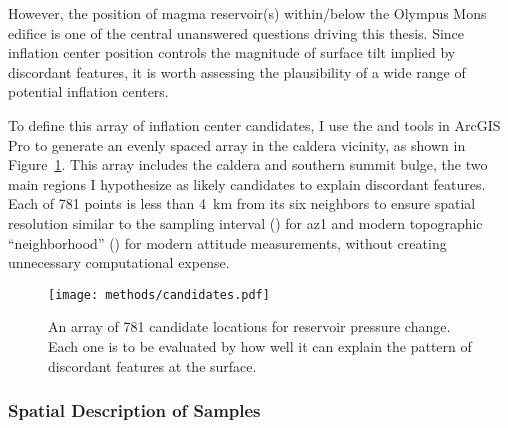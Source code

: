 However, the position of magma reservoir(s) within/below the Olympus Mons edifice is one of the central unanswered questions driving this thesis. Since inflation center position controls the magnitude of surface tilt implied by discordant features, it is worth assessing the plausibility of a wide range of potential inflation centers.

To define this array of inflation center candidates, I use the  and  tools in ArcGIS Pro to generate an evenly spaced array in the caldera vicinity, as shown in Figure~\ref{fig:candidates}. This array includes the caldera and southern summit bulge, the two main regions I hypothesize as likely candidates to explain discordant features. Each of 781 points is less than \qty{4}{\km} from its six neighbors to ensure spatial resolution similar to the sampling interval (\samplinginterval) for \acl{az1} and modern topographic ``neighborhood'' (\neighborhood) for modern attitude measurements, without creating unnecessary computational expense.

\begin{figure}
    \texttt{[image: methods/candidates.pdf]}%
    \caption[Inflation center candidates]{An array of 781 candidate locations for reservoir pressure change. Each one is to be evaluated by how well it can explain the pattern of discordant features at the surface.}%
    \label{fig:candidates}
\end{figure}

\subsubsection{Spatial Description of Samples}

